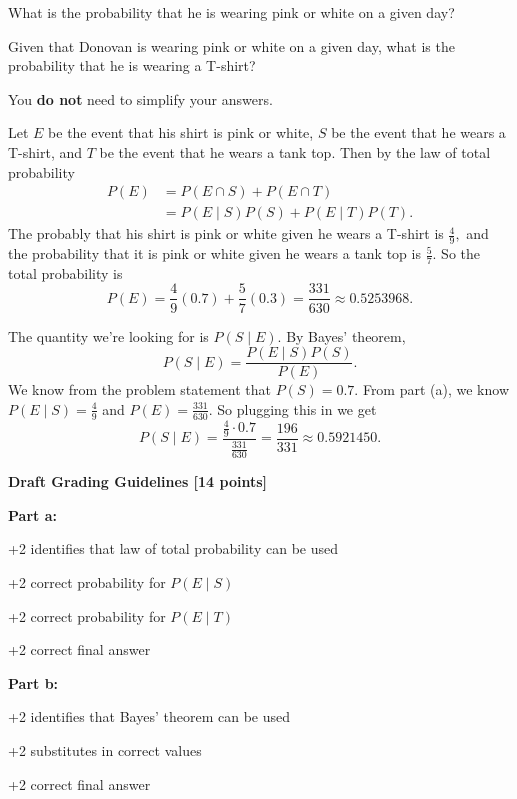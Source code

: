 \documentclass[12pt]{exam}
\begin{document}
\begin{qparts}
    \item What is the probability that he is wearing pink or white on a given day?
    \item Given that Donovan is wearing pink or white on a given day, what is the probability that he is wearing a T-shirt?
\end{qparts}

You \textbf{do not} need to simplify your answers.

\begin{solution}
\begin{qparts}
    \item Let $E$ be the event that his shirt is pink or white, $S$ be the event that he wears a T-shirt, and $T$ be the event that he wears a tank top. Then by the law of total probability
    \begin{align*}
        P(E)&=P(E\cap S) + P(E\cap T) \tag{$S\cap T=\emptyset$} \\
        &=P(E\mid S)P(S) + P(E\mid T)P(T).
    \end{align*}
    The probably that his shirt is pink or white given he wears a T-shirt is $\frac 49,$ and the probability that it is pink or white given he wears a tank top is $\frac 57.$ So the total probability is
    $$P(E)=\frac 49(0.7) + \frac 57(0.3)=\frac{331}{630}\approx 0.5253968.$$

    \item The quantity we're looking for is $P(S\mid E).$ By Bayes' theorem,
    $$P(S\mid E)=\frac{P(E\mid S)P(S)}{P(E)}.$$
    We know from the problem statement that $P(S)=0.7.$ From part (a), we know $P(E\mid S)=\frac 49$ and $P(E)=\frac{331}{630}.$ So plugging this in we get
    $$P(S\mid E)=\frac{\frac 49 \cdot 0.7}{\frac{331}{630}} = \frac{196}{331} \approx 0.5921450.$$
\end{qparts}


\textbf{Draft Grading Guidelines [14 points]}

\textbf{Part a:}
\begin{guidelines}
    \item +2 identifies that law of total probability can be used
    \item +2 correct probability for $P(E\mid S)$
    \item +2 correct probability for $P(E\mid T)$
    \item +2 correct final answer
\end{guidelines}
\textbf{Part b:}
\begin{guidelines}
    \item +2 identifies that Bayes' theorem can be used
    \item +2 substitutes in correct values
    \item +2 correct final answer
\end{guidelines}
\end{solution}
\end{document}
